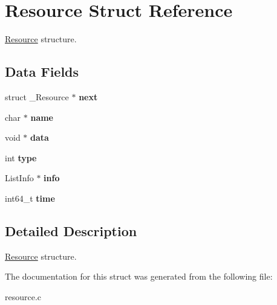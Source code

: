 \hypertarget{structResource}{}\section{Resource Struct Reference}
\label{structResource}


\hyperlink{structResource}{Resource} structure.  


\subsection*{Data Fields}
\begin{DoxyCompactItemize}
\item 
\mbox{\label{structResource_afdf0d3f59a22a2a08033700bcdb1ec2c}} 
struct \+\_\+\+Resource $\ast$ {\bfseries next}
\item 
\mbox{\label{structResource_aed7a7517b5a60d2607a2efcfae2e25ed}} 
char $\ast$ {\bfseries name}
\item 
\mbox{\label{structResource_ae9cf3a6407991247cf7920f5393fe6b5}} 
void $\ast$ {\bfseries data}
\item 
\mbox{\label{structResource_a38898d77710552a137ec862f7692f48e}} 
int {\bfseries type}
\item 
\mbox{\label{structResource_a08530c72414898815955834a7b7cac2c}} 
List\+Info $\ast$ {\bfseries info}
\item 
\mbox{\label{structResource_a7d32069f1bd1d61514328d3bcb8ac655}} 
int64\+\_\+t {\bfseries time}
\end{DoxyCompactItemize}


\subsection{Detailed Description}
\hyperlink{structResource}{Resource} structure. 

The documentation for this struct was generated from the following file\+:\begin{DoxyCompactItemize}
\item 
resource.\+c\end{DoxyCompactItemize}
